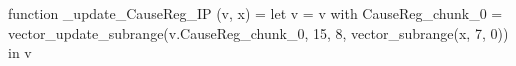 function _update_CauseReg_IP (v, x) = let v = { v with CauseReg_chunk_0 = vector_update_subrange(v.CauseReg_chunk_0, 15, 8, vector_subrange(x, 7, 0)) } in v
